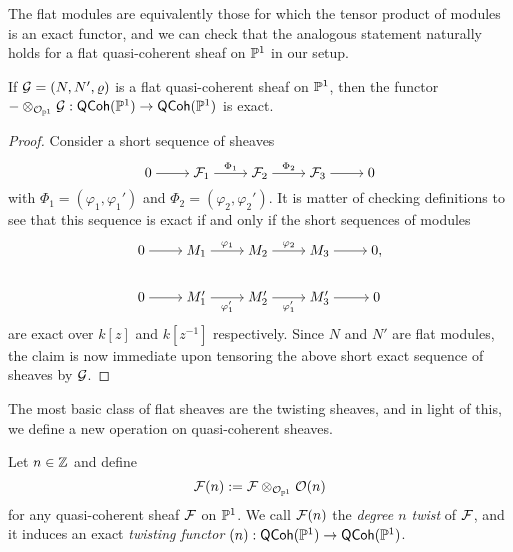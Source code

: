 The flat modules are equivalently those for which the tensor product
of modules is an exact functor, and we can check that the analogous
statement naturally holds for a flat quasi-coherent sheaf on
$\mathbb{P}^{{1}}$ in our setup.

\begin{proposition}
  If $\mathcal{G} = (N, N', \varrho)$ is a flat quasi-coherent sheaf on
  $\mathbb{P}^{{1}}$, then the functor $- \otimes_{\mathcal{O}_{{\mathbb{P}^{{1}}}}} \mathcal{G}: \operatorname{\mathsf{QCoh}}(\mathbb{P}^{{1}})
  \to \operatorname{\mathsf{QCoh}}(\mathbb{P}^{{1}})$ is exact.
\end{proposition}

\begin{proof}
  Consider a short sequence of sheaves
  \[
    \begin{tikzcd}[cramped]
      0 & {\shf{F}_1} & {\shf{F}_2} & {\shf{F}_3} & 0
      \arrow[from=1-1, to=1-2]
      \arrow["{\Phi_1}", from=1-2, to=1-3]
      \arrow["{\Phi_2}", from=1-3, to=1-4]
      \arrow[from=1-4, to=1-5]
    \end{tikzcd}
  \]
  with $\Phi_1 = (\varphi_1, \varphi_1')$ and $\Phi_2 = (\varphi_2,
  \varphi_2')$.
  It is matter of checking definitions to see that this sequence is
  exact if and only if the short sequences of modules
  \[
    \begin{tikzcd}[cramped]
      0 & {M_1} & {M_2} & {M_3} & 0, \\
      0 & {M_1'} & {M_2'} & {M_3'} & 0
      \arrow[from=1-1, to=1-2]
      \arrow["{\varphi_1}", from=1-2, to=1-3]
      \arrow["{\varphi_2}", from=1-3, to=1-4]
      \arrow[from=1-4, to=1-5]
      \arrow[from=2-1, to=2-2]
      \arrow["{\varphi_1'}"', from=2-2, to=2-3]
      \arrow["{\varphi_1'}"', from=2-3, to=2-4]
      \arrow[from=2-4, to=2-5]
    \end{tikzcd}
  \]
  are exact over $k[z]$ and $k[z^{-1}]$ respectively.
  Since $N$ and $N'$ are flat modules, the claim is now immediate
  upon tensoring the above short exact sequence of sheaves by $\mathcal{G}$.
\end{proof}

The most basic class of flat sheaves are the twisting sheaves, and in
light of this, we define a new operation on quasi-coherent sheaves.

\begin{definition}
  Let $n \in \mathbb{Z}$ and define
  \[
    \mathcal{F}(n) := \mathcal{F} \otimes_{\mathcal{O}_{{\mathbb{P}^{{1}}}}} \mathcal{O}({n})
  \]
  for any quasi-coherent sheaf $\mathcal{F}$ on $\mathbb{P}^{{1}}$.
  We call $\mathcal{F}(n)$ the \emph{degree $n$ twist} of $\mathcal{F}$, and
  it induces an exact \emph{twisting functor} $(n): \operatorname{\mathsf{QCoh}}(\mathbb{P}^{{1}})
  \to \operatorname{\mathsf{QCoh}}(\mathbb{P}^{{1}})$.
\end{definition}

